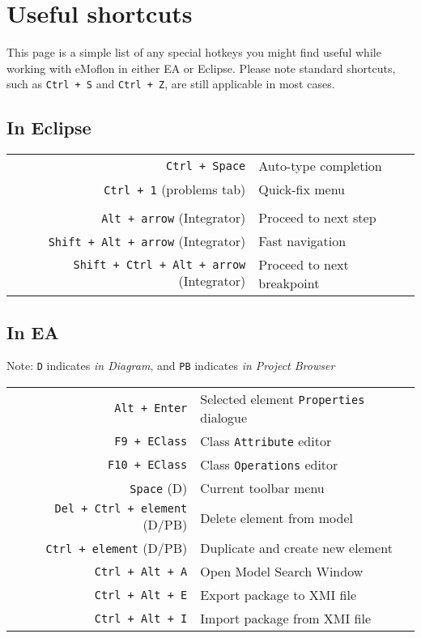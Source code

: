\newpage
\section{Useful shortcuts}
\genHeader

This page is a simple list of any special hotkeys you might find useful while working with eMoflon in either EA or Eclipse. Please note standard
shortcuts, such as \texttt{Ctrl + S} and \texttt{Ctrl + Z}, are still applicable in most cases.

\subsection{In Eclipse}

\begin{tabular}{r|l}
\texttt{Ctrl + Space} & Auto-type completion\\
\texttt{Ctrl + 1} (problems tab) & Quick-fix menu \\
\\
\texttt{Alt + arrow} (Integrator) & Proceed to next step \\
\texttt{Shift + Alt + arrow} (Integrator) & Fast navigation \\
\texttt{Shift + Ctrl + Alt + arrow} (Integrator) & Proceed to next breakpoint \\
%
\end{tabular}

\vspace{0.5cm}

\subsection{In EA}

{\small Note: \texttt{D} indicates \emph{in Diagram}, and \texttt{PB} indicates \emph{in Project Browser}}

\begin{tabular}{r|l}
\texttt{Alt + Enter} & Selected element \texttt{Properties} dialogue \\
\texttt{F9 + EClass} & Class \texttt{Attribute} editor \\
\texttt{F10 + EClass} & Class \texttt{Operations} editor \\
\texttt{Space} (D) & Current toolbar menu \\
\texttt{Del + Ctrl + element} (D/PB) & Delete element from model\\
\texttt{Ctrl + element} (D/PB) & Duplicate and create new element \\
\texttt{Ctrl + Alt + A} & Open Model Search Window \\
\texttt{Ctrl + Alt + E} & Export package to XMI file \\
\texttt{Ctrl + Alt + I} & Import package from XMI file \\
%
\end{tabular}
